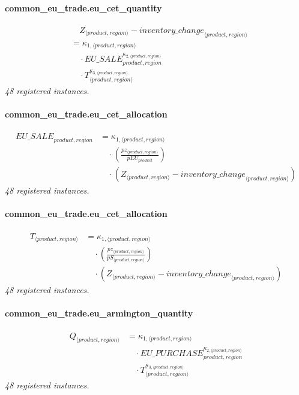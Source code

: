 \documentclass[11pt]{article}
\begin{document}
\paragraph{common\_eu\_trade.eu\_cet\_quantity}
\begin{align*}
&\quad Z_{\langle product, region\rangle} - {inventory\_change}_{\langle product, region\rangle}\\
&= \kappa_{1,\langle product, region\rangle}\\
&\quad {}\cdot {EU\_SALE}_{product,region}^{\kappa_{2,\langle product, region\rangle}}\\
&\quad {}\cdot T_{\langle product, region\rangle}^{\kappa_{3,\langle product, region\rangle}}
\end{align*}
\noindent\emph{48 registered instances.}\par
\paragraph{common\_eu\_trade.eu\_cet\_allocation}
\begin{align*}
{EU\_SALE}_{product,region} &= \kappa_{1,\langle product, region\rangle}\\
&\quad {}\cdot (\frac{pz_{\langle product, region\rangle}}{pEU_{product}})\\
&\quad {}\cdot (Z_{\langle product, region\rangle} - {inventory\_change}_{\langle product, region\rangle})
\end{align*}
\noindent\emph{48 registered instances.}\par
\paragraph{common\_eu\_trade.eu\_cet\_allocation}
\begin{align*}
T_{\langle product, region\rangle} &= \kappa_{1,\langle product, region\rangle}\\
&\quad {}\cdot (\frac{pz_{\langle product, region\rangle}}{pS_{\langle product, region\rangle}})\\
&\quad {}\cdot (Z_{\langle product, region\rangle} - {inventory\_change}_{\langle product, region\rangle})
\end{align*}
\noindent\emph{48 registered instances.}\par
\paragraph{common\_eu\_trade.eu\_armington\_quantity}
\begin{align*}
Q_{\langle product, region\rangle} &= \kappa_{1,\langle product, region\rangle}\\
&\quad {}\cdot {EU\_PURCHASE}_{product,region}^{\kappa_{2,\langle product, region\rangle}}\\
&\quad {}\cdot T_{\langle product, region\rangle}^{\kappa_{3,\langle product, region\rangle}}
\end{align*}
\noindent\emph{48 registered instances.}\par
\end{document}
